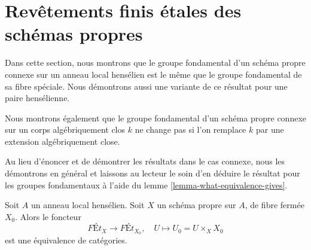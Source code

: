 \section{Revêtements finis étales des schémas propres}
\label{section-finite-etale-over-proper}

\noindent
Dans cette section, nous montrons que le groupe fondamental d'un schéma propre
connexe sur un anneau local hensélien est le même que le groupe fondamental
de sa fibre spéciale. Nous démontrons aussi une variante de ce résultat pour
une paire hensélienne.

\medskip\noindent
Nous montrons également que le groupe
fondamental d'un schéma propre connexe sur un corps algébriquement clos $k$
ne change pas si l'on remplace $k$ par une extension algébriquement close.

\medskip\noindent
Au lieu d'énoncer et de démontrer les résultats dans le cas connexe,
nous les démontrons en général et laissons au lecteur le soin d'en déduire
le résultat pour les groupes fondamentaux à l'aide du
lemme \ref{lemma-what-equivalence-gives}.

\begin{lemma}
\label{lemma-finite-etale-on-proper-over-henselian}
Soit $A$ un anneau local hensélien. Soit $X$ un schéma propre sur $A$,
de fibre fermée $X_0$. Alors le foncteur
$$
\textit{F\'Et}_X \to \textit{F\'Et}_{X_0},\quad
U \longmapsto U_0 = U \times_X X_0
$$
est une équivalence de catégories.
\end{lemma}

